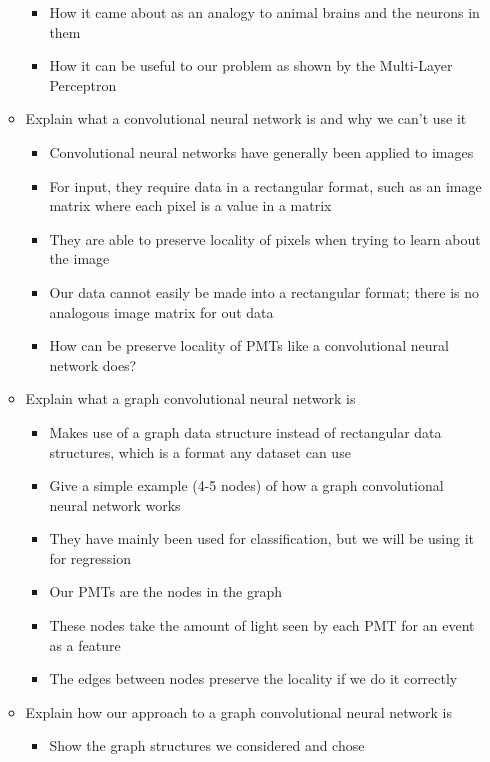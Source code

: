\documentclass[12pt]{article}
\begin{document}
\begin{itemize}
\begin{itemize}
					\begin{itemize}
						\item How it came about as an analogy to animal brains and the neurons in them
						\item How it can be useful to our problem as shown by the Multi-Layer Perceptron
					\end{itemize}
				\item Explain what a convolutional neural network is and why we can't use it
					\begin{itemize}
						\item Convolutional neural networks have generally been applied to images
						\item For input, they require data in a rectangular format, such as an image matrix where each pixel is a value in a matrix
						\item They are able to preserve locality of pixels when trying to learn about the image
						\item Our data cannot easily be made into a rectangular format; there is no analogous image matrix for out data
						\item How can be preserve locality of PMTs like a convolutional neural network does?
					\end{itemize}
				\item Explain what a graph convolutional neural network is
					\begin{itemize}
						\item Makes use of a graph data structure instead of rectangular data structures, which is a format any dataset can use
						\item Give a simple example (4-5 nodes) of how a graph convolutional neural network works
						\item They have mainly been used for classification, but we will be using it for regression
						\item Our PMTs are the nodes in the graph
						\item These nodes take the amount of light seen by each PMT for an event as a feature
						\item The edges between nodes preserve the locality if we do it correctly
					\end{itemize}
				\item Explain how our approach to a graph convolutional neural network is
					\begin{itemize}
						\item Show the graph structures we considered and chose

\end{itemize}
\end{itemize}
\end{itemize}
\end{document}
